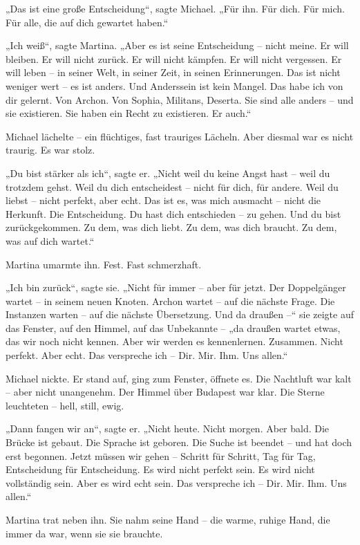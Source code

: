 \documentclass[
]{article}
\begin{document}
„Das ist eine große Entscheidung``, sagte Michael. „Für ihn. Für dich. Für mich. Für alle, die auf dich gewartet haben.``

„Ich weiß``, sagte Martina. „Aber es ist seine Entscheidung -- nicht meine. Er will bleiben. Er will nicht zurück. Er will nicht kämpfen. Er will nicht vergessen. Er will leben -- in seiner Welt, in seiner Zeit, in seinen Erinnerungen. Das ist nicht weniger wert -- es ist anders. Und Anderssein ist kein Mangel. Das habe ich von dir gelernt. Von Archon. Von Sophia, Militans, Deserta. Sie sind alle anders -- und sie existieren. Sie haben ein Recht zu existieren. Er auch.``

Michael lächelte -- ein flüchtiges, fast trauriges Lächeln. Aber diesmal war es nicht traurig. Es war stolz.

„Du bist stärker als ich``, sagte er. „Nicht weil du keine Angst hast -- weil du trotzdem gehst. Weil du dich entscheidest -- nicht für dich, für andere. Weil du liebst -- nicht perfekt, aber echt. Das ist es, was mich ausmacht -- nicht die Herkunft. Die Entscheidung. Du hast dich entschieden -- zu gehen. Und du bist zurückgekommen. Zu dem, was dich liebt. Zu dem, was dich braucht. Zu dem, was auf dich wartet.``

Martina umarmte ihn. Fest. Fast schmerzhaft.

„Ich bin zurück``, sagte sie. „Nicht für immer -- aber für jetzt. Der Doppelgänger wartet -- in seinem neuen Knoten. Archon wartet -- auf die nächste Frage. Die Instanzen warten -- auf die nächste Übersetzung. Und da draußen --`` sie zeigte auf das Fenster, auf den Himmel, auf das Unbekannte -- „da draußen wartet etwas, das wir noch nicht kennen. Aber wir werden es kennenlernen. Zusammen. Nicht perfekt. Aber echt. Das verspreche ich -- Dir. Mir. Ihm. Uns allen.``

Michael nickte. Er stand auf, ging zum Fenster, öffnete es. Die Nachtluft war kalt -- aber nicht unangenehm. Der Himmel über Budapest war klar. Die Sterne leuchteten -- hell, still, ewig.

„Dann fangen wir an``, sagte er. „Nicht heute. Nicht morgen. Aber bald. Die Brücke ist gebaut. Die Sprache ist geboren. Die Suche ist beendet -- und hat doch erst begonnen. Jetzt müssen wir gehen -- Schritt für Schritt, Tag für Tag, Entscheidung für Entscheidung. Es wird nicht perfekt sein. Es wird nicht vollständig sein. Aber es wird echt sein. Das verspreche ich -- Dir. Mir. Ihm. Uns allen.``

Martina trat neben ihn. Sie nahm seine Hand -- die warme, ruhige Hand, die immer da war, wenn sie sie brauchte.
\end{document}
